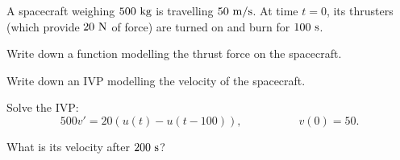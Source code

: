 \begin{applicationActivities}

\begin{activity}{30}
A spacecraft weighing \(500\ {\rm kg}\) is travelling \(50\ {\rm m/s}\).  At time \(t=0\), its thrusters (which provide \(20\ {\rm N}\) of force) are turned on and burn for \(100\ {\rm s}\).  
\begin{subactivity}
Write down a function modelling the thrust force on the spacecraft.
\end{subactivity}
\begin{subactivity}
Write down an IVP modelling the velocity of the spacecraft.
\end{subactivity}
\begin{subactivity}
Solve the IVP: \[ 500v' = 20 \left( u(t)-u(t-100)\right), \hspace{5em} v(0)=50.\]
\end{subactivity}
\begin{subactivity}
What is its velocity after \(200\ {\rm s}\)?
\end{subactivity}
\end{activity}
\end{applicationActivities}
